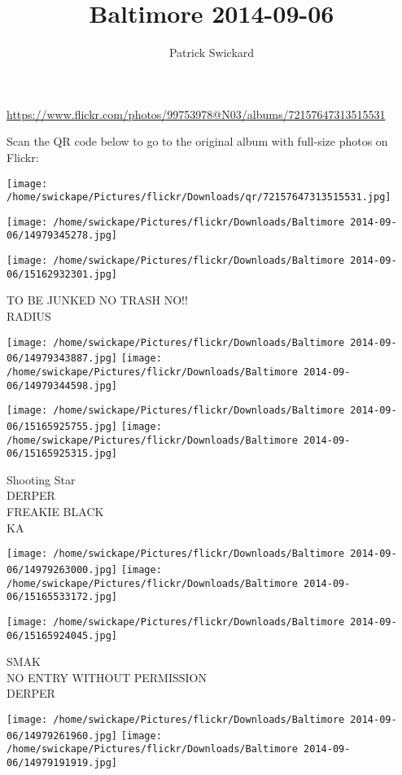 \documentclass[10pt,letterpaper]{article}
\title{Baltimore 2014-09-06}
\author{Patrick Swickard}
\date{}
\begin{document}
\maketitle

\url{https://www.flickr.com/photos/99753978@N03/albums/72157647313515531}

Scan the QR code below to go to the original album with full-size photos on Flickr:

\texttt{[image: /home/swickape/Pictures/flickr/Downloads/qr/72157647313515531.jpg]}
\pagebreak

\texttt{[image: /home/swickape/Pictures/flickr/Downloads/Baltimore 2014-09-06/14979345278.jpg]}

\vspace{0.25in}
\texttt{[image: /home/swickape/Pictures/flickr/Downloads/Baltimore 2014-09-06/15162932301.jpg]}

TO BE JUNKED NO TRASH NO!!\\
RADIUS
\pagebreak

\texttt{[image: /home/swickape/Pictures/flickr/Downloads/Baltimore 2014-09-06/14979343887.jpg]}
\texttt{[image: /home/swickape/Pictures/flickr/Downloads/Baltimore 2014-09-06/14979344598.jpg]}

\texttt{[image: /home/swickape/Pictures/flickr/Downloads/Baltimore 2014-09-06/15165925755.jpg]}
\texttt{[image: /home/swickape/Pictures/flickr/Downloads/Baltimore 2014-09-06/15165925315.jpg]}

Shooting Star\\
DERPER\\
FREAKIE BLACK\\
KA
\pagebreak

\texttt{[image: /home/swickape/Pictures/flickr/Downloads/Baltimore 2014-09-06/14979263000.jpg]}
\texttt{[image: /home/swickape/Pictures/flickr/Downloads/Baltimore 2014-09-06/15165533172.jpg]}

\vspace{0.25in}
\texttt{[image: /home/swickape/Pictures/flickr/Downloads/Baltimore 2014-09-06/15165924045.jpg]}

SMAK\\
NO ENTRY WITHOUT PERMISSION\\
DERPER
\pagebreak

\texttt{[image: /home/swickape/Pictures/flickr/Downloads/Baltimore 2014-09-06/14979261960.jpg]}
\texttt{[image: /home/swickape/Pictures/flickr/Downloads/Baltimore 2014-09-06/14979191919.jpg]}
\end{document}
